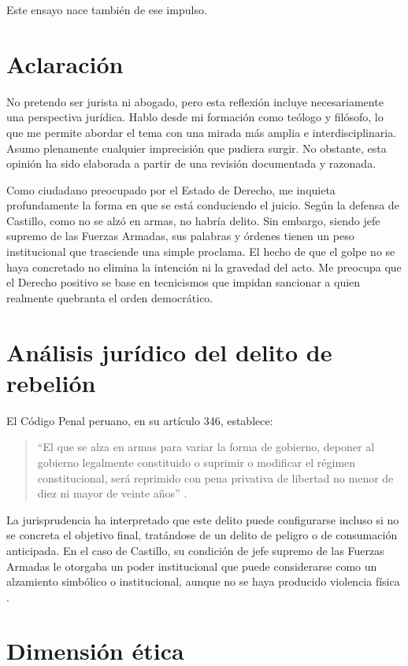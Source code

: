 \documentclass[12pt]{article}
\begin{document}
	Este ensayo nace también de ese impulso.
	
	\section*{Aclaraci\'on}
	No pretendo ser jurista ni abogado, pero esta reflexión incluye necesariamente una perspectiva jurídica. Hablo desde mi formación como teólogo y filósofo, lo que me permite abordar el tema con una mirada más amplia e interdisciplinaria. Asumo plenamente cualquier imprecisión que pudiera surgir. No obstante, esta opinión ha sido elaborada a partir de una revisión documentada y razonada.
	
	Como ciudadano preocupado por el Estado de Derecho, me inquieta profundamente la forma en que se está conduciendo el juicio. Según la defensa de Castillo, como no se alzó en armas, no habría delito. Sin embargo, siendo jefe supremo de las Fuerzas Armadas, sus palabras y órdenes tienen un peso institucional que trasciende una simple proclama. El hecho de que el golpe no se haya concretado no elimina la intención ni la gravedad del acto. Me preocupa que el Derecho positivo se base en tecnicismos que impidan sancionar a quien realmente quebranta el orden democrático.
	
	\section*{Análisis jurídico del delito de rebelión}
	
	El Código Penal peruano, en su artículo 346, establece:
	
	\begin{quote}
		“El que se alza en armas para variar la forma de gobierno, deponer al gobierno legalmente constituido o suprimir o modificar el régimen constitucional, será reprimido con pena privativa de libertad no menor de diez ni mayor de veinte años” \cite{codigo_penal}.
	\end{quote}
	
	La jurisprudencia ha interpretado que este delito puede configurarse incluso si no se concreta el objetivo final, tratándose de un delito de peligro o de consumación anticipada. En el caso de Castillo, su condición de jefe supremo de las Fuerzas Armadas le otorgaba un poder institucional que puede considerarse como un alzamiento simbólico o institucional, aunque no se haya producido violencia física \cite{jurisprudencia_rebelion}.
	
	\section*{Dimensión ética}
	
\end{document}
